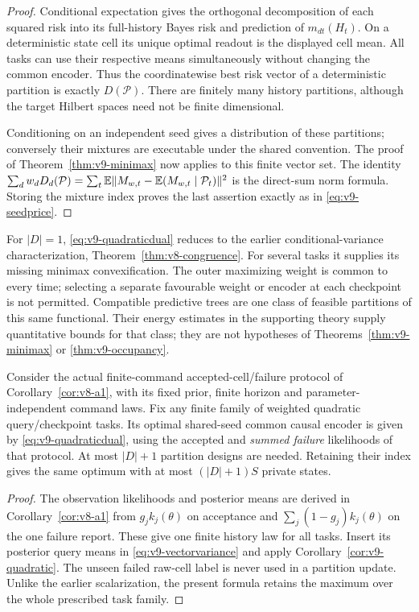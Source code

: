 \begin{proof}
Conditional expectation gives the orthogonal decomposition of each
squared risk into its full-history Bayes risk and prediction of
$m_{dt}(H_t)$. On a deterministic state cell its unique optimal readout
is the displayed cell mean. All tasks can use their respective means
simultaneously without changing the common encoder. Thus the
coordinatewise best risk vector of a deterministic partition is exactly
$D(\mathcal P)$. There are finitely many history partitions, although
the target Hilbert spaces need not be finite dimensional.

Conditioning on an independent seed gives a distribution of these
partitions; conversely their mixtures are executable under the shared
convention. The proof of Theorem~\ref{thm:v9-minimax} now applies to this
finite vector set. The identity
$\sum_dw_dD_d(\mathcal P)=\sum_t\mathbb E\|M_{w,t}-\mathbb E(M_{w,t}\mid\mathcal P_t)\|^2$
is the direct-sum norm formula. Storing the mixture index proves the
last assertion exactly as in \eqref{eq:v9-seedprice}.
\end{proof}

For $|D|=1$, \eqref{eq:v9-quadraticdual} reduces to the earlier
conditional-variance characterization, Theorem~\ref{thm:v8-congruence}.
For several tasks it supplies its missing minimax convexification. The
outer maximizing weight is common to every time; selecting a separate
favourable weight or encoder at each checkpoint is not permitted.
Compatible predictive trees are one class of feasible partitions of this
same functional. Their energy estimates in the supporting theory supply
quantitative bounds for that class; they are not hypotheses of
Theorems~\ref{thm:v9-minimax} or \ref{thm:v9-occupancy}.

\begin{corollary}
\label{cor:v9-a1}
Consider the actual finite-command accepted-cell/failure protocol of
Corollary~\ref{cor:v8-a1}, with its fixed prior, finite horizon and
parameter-independent command laws. Fix any finite family of weighted
quadratic query/checkpoint tasks. Its optimal shared-seed common causal
encoder is given by \eqref{eq:v9-quadraticdual}, using the accepted and
\emph{summed failure} likelihoods of that protocol. At most $|D|+1$
partition designs are needed. Retaining their index gives the same
optimum with at most $(|D|+1)S$ private states.
\end{corollary}
\begin{proof}
The observation likelihoods and posterior means are derived in
Corollary~\ref{cor:v8-a1} from $g_jk_j(\theta)$ on acceptance and
$\sum_j(1-g_j)k_j(\theta)$ on the one failure report. These give one
finite history law for all tasks. Insert its posterior query means in
\eqref{eq:v9-vectorvariance} and apply Corollary~\ref{cor:v9-quadratic}.
The unseen failed raw-cell label is never used in a partition update.
Unlike the earlier scalarization, the present formula retains the
maximum over the whole prescribed task family.
\end{proof}


